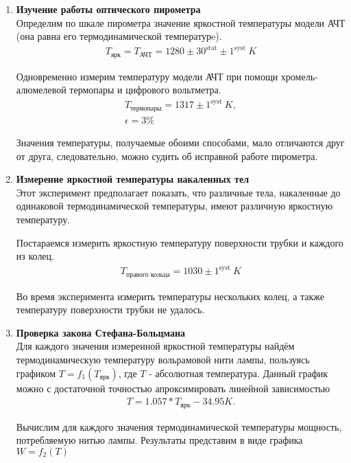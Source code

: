 \begin{enumerate}

\item 
\textbf{Изучение работы оптического пирометра}\\
Определим по шкале пирометра значение яркостной температуры модели АЧТ (она равна его термодинамической температурe).
\begin{gather*}
T_{\text{ярк}} = T_{\text{АЧТ}} = 1280 \pm 30^{\text{stat}} \pm 1^{\text{syst}}~K
\end{gather*}

Одновременно измерим температуру модели АЧТ при помощи хромель-алюмелевой термопары и цифрового вольтметра.
\begin{gather*}
T_{\text{термопары}} = 1317 \pm 1^{\text{syst}}~K,\\
\epsilon = 3 \%
\end{gather*}

Значения температуры, получаемые обоими способами, мало отличаются друг от друга, следовательно, можно судить об исправной работе пирометра. 

\item
\textbf{Измерение яркостной температуры накаленных тел}\\
Этот эксперимент предполагает показать, что различные тела, накаленные до одинаковой термодинамической температуры, имеют различную яркостную температуру.

Постараемся измерить яркостную температуру поверхности трубки и каждого из колец. 
\begin{gather*}
T_{\text{правого кольца}} = 1030 \pm 1^{\text{syst}}~K
\end{gather*}

Во время эксперимента измерить температуры нескольких колец, а также температуру поверхности трубки не удалось.

\item
\textbf{Проверка закона Стефана-Больцмана}\\
Для каждого значения измеренной яркостной температуры найдём термодинамическую температуру вольрамовой нити лампы, пользуясь графиком $T = f_1(T_{\text{ярк}})$, где $T$ - абсолютная температура. Данный график можно с достаточной точностью апроксимировать линейной зависимостью
\begin{gather*}
T = 1.057 * T_{\text{ярк}} - 34.95 K.
\end{gather*}

Вычислим для каждого значения термодинамической температуры мощность, потребляемую нитью лампы. Результаты представим в виде графика $W = f_2(T)$


\end{enumerate}
